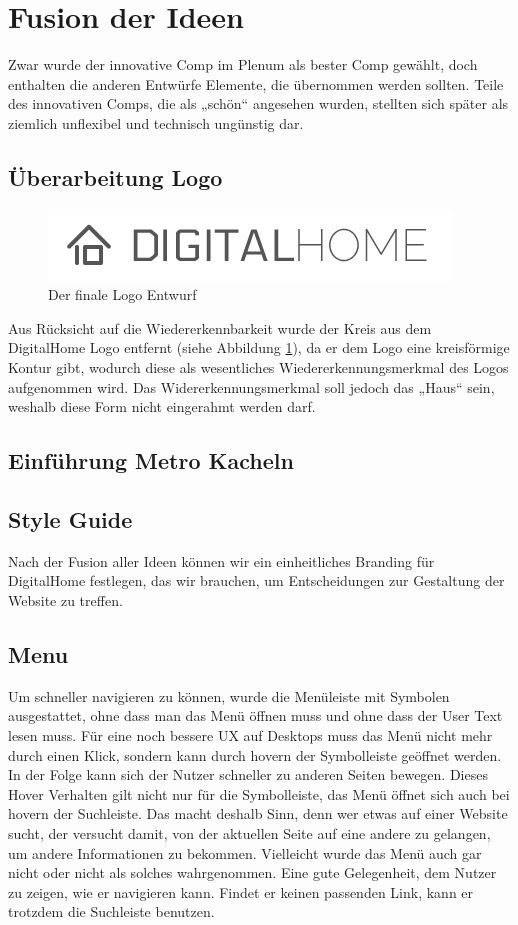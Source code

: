 \section{Fusion der Ideen}
Zwar wurde der innovative Comp im Plenum als bester Comp gewählt, doch enthalten die anderen Entwürfe Elemente, die übernommen werden sollten. Teile des innovativen Comps, die als „schön“ angesehen wurden, stellten sich später als ziemlich unflexibel und technisch ungünstig dar.
\subsection{Überarbeitung Logo}
\begin{figure} [tp]
\includegraphics[width=\textwidth]{./img/logo3.png}
\caption{Der finale Logo Entwurf}
\label{logo3}
\end{figure}
Aus Rücksicht auf die Wiedererkennbarkeit wurde der Kreis aus dem DigitalHome Logo entfernt (siehe Abbildung \ref{logo3}), da er dem Logo eine kreisförmige Kontur gibt, wodurch diese als wesentliches Wiedererkennungsmerkmal des Logos aufgenommen wird. Das Widererkennungsmerkmal soll jedoch das „Haus“ sein, weshalb diese Form nicht eingerahmt werden darf.

\subsection{Einführung Metro Kacheln}
\subsection{Style Guide}
Nach der Fusion aller Ideen können wir ein einheitliches Branding für DigitalHome festlegen, das wir brauchen, um Entscheidungen zur Gestaltung der Website zu treffen.
\subsection{Menu}
Um schneller navigieren zu können, wurde die Menüleiste mit Symbolen ausgestattet, ohne dass man das Menü öffnen muss und ohne dass der User Text lesen muss. Für eine noch bessere UX auf Desktops muss das Menü nicht mehr durch einen Klick, sondern kann durch hovern der Symbolleiste geöffnet werden. In der Folge kann sich der Nutzer schneller zu anderen Seiten bewegen. Dieses Hover Verhalten gilt nicht nur für die Symbolleiste, das Menü öffnet sich auch bei hovern der Suchleiste. Das macht deshalb Sinn, denn wer etwas auf einer Website sucht, der versucht damit, von der aktuellen Seite auf eine andere zu gelangen, um andere Informationen zu bekommen. Vielleicht wurde das Menü auch gar nicht oder nicht als solches wahrgenommen. Eine gute Gelegenheit, dem Nutzer zu zeigen, wie er navigieren kann. Findet er keinen passenden Link, kann er trotzdem die Suchleiste benutzen.
